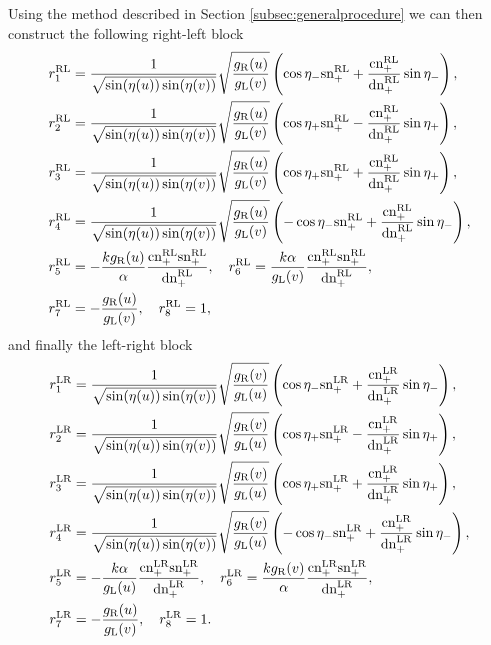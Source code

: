 \documentclass[12pt,a4paper]{article}
\numberwithin{equation}{section}
\begin{document}
Using the method described in Section \ref{subsec:generalprocedure} we can then construct the following right-left block
\begin{align}
& r_1^{{\rm RL}}=\frac{1}{\sqrt{\sin(\eta(u))\sin(\eta(v))}}\sqrt{\frac{g_{{\rm R}}(u)}{g_{{\rm L}}(v)}}\left(\cos\eta_-\text{sn}^{{\rm RL}}_++\frac{\text{cn}^{{\rm RL}}_+}{\text{dn}^{{\rm RL}}_+}\sin\eta_-\right),\nonumber\\
& r_2^{{\rm RL}}=\frac{1}{\sqrt{\sin(\eta(u))\sin(\eta(v))}}\sqrt{\frac{g_{{\rm R}}(u)}{g_{{\rm L}}(v)}}\left(\cos\eta_+\text{sn}^{{\rm RL}}_+-\frac{\text{cn}^{{\rm RL}}_+}{\text{dn}^{{\rm RL}}_+}\sin\eta_+\right),\nonumber\\
&r_3^{{\rm RL}}=\frac{1}{\sqrt{\sin(\eta(u))\sin(\eta(v))}}\sqrt{\frac{g_{{\rm R}}(u)}{g_{{\rm L}}(v)}}\left(\cos\eta_+\text{sn}^{{\rm RL}}_++\frac{\text{cn}^{{\rm RL}}_+}{\text{dn}^{{\rm RL}}_+}\sin\eta_+\right),\nonumber\\
&r_4^{{\rm RL}}=\frac{1}{\sqrt{\sin(\eta(u))\sin(\eta(v))}}\sqrt{\frac{g_{{\rm R}}(u)}{g_{{\rm L}}(v)}}\left(-\cos\eta_-\text{sn}^{{\rm RL}}_++\frac{\text{cn}^{{\rm RL}}_+}{\text{dn}^{{\rm RL}}_+}\sin\eta_-\right),\nonumber\\
& r_5^{{\rm RL}}=-\frac{k g_{{\rm R}}(u)}{\alpha}\frac{\text{cn}^{{\rm RL}}_+\text{sn}^{{\rm RL}}_+}{\text{dn}^{{\rm RL}}_+},\quad r_6^{{\rm RL}}=\frac{k \alpha}{g_{{\rm L}}(v)}\frac{\text{cn}^{{\rm RL}}_+\text{sn}^{{\rm RL}}_+}{\text{dn}^{{\rm RL}}_+},\nonumber\\
&r_7^{{\rm RL}}=-\frac{g_{{\rm R}}(u)}{g_{{\rm L}}(v)},\quad r_8^{{\rm RL}}=1,
\label{eq:RLblock8vB}
\end{align}
and finally the left-right block
\begin{align}
& r_1^{{\rm LR}}=\frac{1}{\sqrt{\sin(\eta(u))\sin(\eta(v))}}\sqrt{\frac{g_{{\rm R}}(v)}{g_{{\rm L}}(u)}}\left(\cos\eta_-\text{sn}^{{\rm LR}}_++\frac{\text{cn}^{{\rm LR}}_+}{\text{dn}^{{\rm LR}}_+}\sin\eta_-\right),\nonumber\\
& r_2^{{\rm LR}}=\frac{1}{\sqrt{\sin(\eta(u))\sin(\eta(v))}}\sqrt{\frac{g_{{\rm R}}(v)}{g_{{\rm L}}(u)}}\left(\cos\eta_+\text{sn}^{{\rm LR}}_+-\frac{\text{cn}^{{\rm LR}}_+}{\text{dn}^{{\rm LR}}_+}\sin\eta_+\right),\nonumber\\
&r_3^{{\rm LR}}=\frac{1}{\sqrt{\sin(\eta(u))\sin(\eta(v))}}\sqrt{\frac{g_{{\rm R}}(v)}{g_{{\rm L}}(u)}}\left(\cos\eta_+\text{sn}^{{\rm LR}}_++\frac{\text{cn}^{{\rm LR}}_+}{\text{dn}^{{\rm LR}}_+}\sin\eta_+\right),\nonumber\\
&r_4^{{\rm LR}}=\frac{1}{\sqrt{\sin(\eta(u))\sin(\eta(v))}}\sqrt{\frac{g_{{\rm R}}(v)}{g_{{\rm L}}(u)}}\left(-\cos\eta_-\text{sn}^{{\rm LR}}_++\frac{\text{cn}^{{\rm LR}}_+}{\text{dn}^{{\rm LR}}_+}\sin\eta_-\right),\nonumber\\
& r_5^{{\rm LR}}=-\frac{k \alpha}{g_{{\rm L}}(u)}\frac{\text{cn}^{{\rm LR}}_+\text{sn}^{{\rm LR}}_+}{\text{dn}^{{\rm LR}}_+},\quad r_6^{{\rm LR}}=\frac{k g_{{\rm R}}(v)}{\alpha}\frac{\text{cn}^{{\rm LR}}_+\text{sn}^{{\rm LR}}_+}{\text{dn}^{{\rm LR}}_+},\nonumber\\
&r_7^{{\rm LR}}=-\frac{g_{{\rm R}}(u)}{g_{{\rm L}}(v)},\quad r_8^{{\rm LR}}=1.
\label{eq:LRblock8vB}
\end{align}
\end{document}

